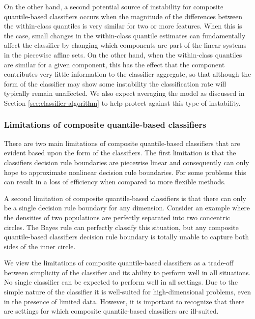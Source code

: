 On the other hand, a second potential source of instability for composite
quantile-based classifiers occurs when the magnitude of the differences between
the within-class quantiles is very similar for two or more features.  When this
is the case, small changes in the within-class quantile estimates can
fundamentally affect the classifier by changing which components are part of the
linear systems in the piecewise affine sets.  On the other hand, when the
within-class quantiles are similar for a given component, this has the effect
that the component contributes very little information to the classifier
aggregate, so that although the form of the classifier may show some instability
the classification rate will typically remain unaffected.  We also expect
averaging the model as discussed in Section \ref{sec:classifier-algorithm} to
help protect against this type of instability.


\subsubsection{Limitations of composite quantile-based classifiers}
\label{sec:limitations}

There are two main limitations of composite quantile-based classifiers that are
evident based upon the form of the classifiers.  The first limitation is that
the classifiers decision rule boundaries are piecewise linear and consequently
can only hope to approximate nonlinear decision rule boundaries.  For some
problems this can result in a loss of efficiency when compared to more flexible
methods.

A second limitation of composite quantile-based classifiers is that there can
only be a single decision rule boundary for any dimension.  Consider an example
where the densities of two populations are perfectly separated into two
concentric circles.  The Bayes rule can perfectly classify this situation, but
any composite quantile-based classifiers decision rule boundary is totally
unable to capture both sides of the inner circle.

We view the limitations of composite quantile-based classifiers as a trade-off
between simplicity of the classifier and its ability to perform well in all
situations.  No single classifier can be expected to perform well in all
settings.  Due to the simple nature of the classifier it is well-suited for
high-dimensional problems, even in the presence of limited data.  However, it is
important to recognize that there are settings for which composite
quantile-based classifiers are ill-suited.




